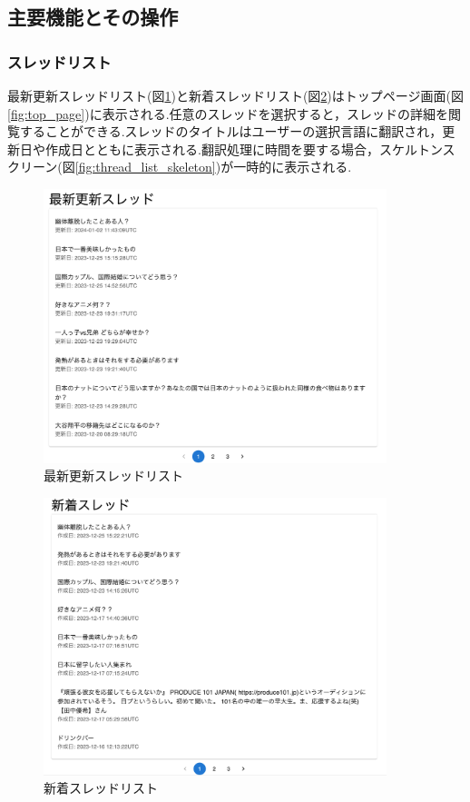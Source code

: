 \documentclass[b5paper,12pt,dvipdfmx]{jsreport}
\begin{document}
\newpage
\subsection{主要機能とその操作}

\subsubsection{スレッドリスト}
最新更新スレッドリスト(図\ref{fig:latest_update_thread_list})と新着スレッドリスト(図\ref{fig:new_thread_list})はトップページ画面(図\ref{fig:top_page})に表示される.任意のスレッドを選択すると，スレッドの詳細を閲覧することができる.スレッドのタイトルはユーザーの選択言語に翻訳され，更新日や作成日とともに表示される.翻訳処理に時間を要する場合，スケルトンスクリーン(図\ref{fig:thread_list_skeleton})が一時的に表示される.

\begin{figure}[H]
	\centering
    \includegraphics[width=100mm,height=79.79mm]{./img/feature/latest_update_thread_list.png}
	\caption{最新更新スレッドリスト}
	\label{fig:latest_update_thread_list}
\end{figure}

\begin{figure}[H]
	\centering
    \includegraphics[width=100mm,height=81.00mm]{./img/feature/new_thread_list.png}
	\caption{新着スレッドリスト}
	\label{fig:new_thread_list}
\end{figure}
\end{document}

